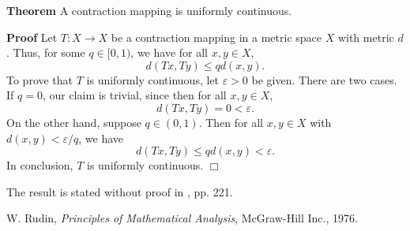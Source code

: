 \documentclass[12pt]{article}
\begin{document}
{\bf Theorem} A contraction mapping is uniformly continuous.

{\bf Proof} Let $T:X\to X$ be a contraction mapping in a metric space
$X$ with metric $d$. Thus, for some $q\in [0,1)$, we have
for all $x,y\in X$,
$$ d(Tx,Ty)\le q d(x,y).$$
To prove that $T$ is uniformly continuous, let $\varepsilon>0$ be given.
There are two cases.
If $q=0$, our claim is trivial, since then for all $x,y\in X$,
 $$ d(Tx,Ty)=0<\varepsilon.$$
On the other hand, suppose $q\in(0,1)$. Then for all $x,y\in X$ with
$d(x,y)<\varepsilon/q$, we have
$$ d(Tx,Ty) \le q d(x,y) < \varepsilon.$$
In conclusion, $T$ is uniformly continuous. $\Box$

The result is stated without proof in \cite{rudin}, pp. 221.

\begin{thebibliography}{9}
 W. Rudin, \emph{Principles of Mathematical Analysis}, McGraw-Hill Inc., 1976.
\end{thebibliography}
\end{document}
